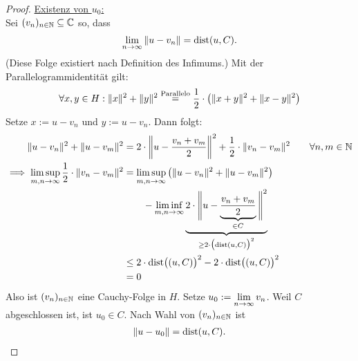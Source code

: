 \begin{proof}
\underline{Existenz von $u_0$:}\\
Sei $(v_n)_{n\in\mathbb{N}}\subseteq\mathbb{C}$ so, dass
\begin{align*}
\lim\limits_{n\to\infty}\Vert u-v_n\Vert
=\text{dist}(u,C).
\end{align*}
(Diese Folge existiert nach Definition des Infimums.) Mit der Parallelogrammidentität gilt:
\begin{align*}
\forall x,y\in H:\Vert x\Vert^2+\Vert y\Vert^2\stackrel{\text{Parallelo}}{=}\frac{1}{2}\cdot\left(\Vert x+y\Vert^2+\Vert x-y\Vert^2\right)
\end{align*}
Setze $x:=u-v_n$ und $y:=u-v_n$. Dann folgt:
\begin{align*}
\Vert u-v_n\Vert^2+\Vert u-v_m\Vert^2
&=2\cdot\left\Vert u-\frac{v_n+v_m}{2}\right\Vert^2+\frac{1}{2}\cdot\Vert v_n-v_m\Vert^2
\qquad\forall n,m\in\mathbb{N}\\
\implies
\limsup\limits_{m,n\to\infty}\frac{1}{2}\cdot\Vert v_n-v_m\Vert^2
&=\limsup\limits_{m,n\to\infty}\left(\Vert u-v_n\Vert^2+\Vert u-v_m\Vert^2\right)\\
&\qquad-\liminf\limits_{m,n\to\infty} \underbrace{2\cdot\Bigg\Vert u-\underbrace{\frac{v_n+v_m}{2}}_{\in C}\Bigg\Vert^2}_{\geq2\cdot\big(\text{dist}(u,C)\big)^2}\\
&\leq2\cdot\text{dist}\big((u,C)\big)^2-2\cdot\text{dist}\big((u,C)\big)^2\\
&=0
\end{align*}
Also ist $(v_n)_{n\in\mathbb{N}}$ eine Cauchy-Folge in $H$. Setze $u_0:=\lim\limits_{n\to\infty} v_n$. Weil $C$ abgeschlossen ist, ist $u_0\in C$. Nach Wahl von $(v_n)_{n\in\mathbb{N}}$ ist
\begin{align*}
\Vert u-u_0\Vert=\text{dist}(u,C).
\end{align*}


\end{proof}

